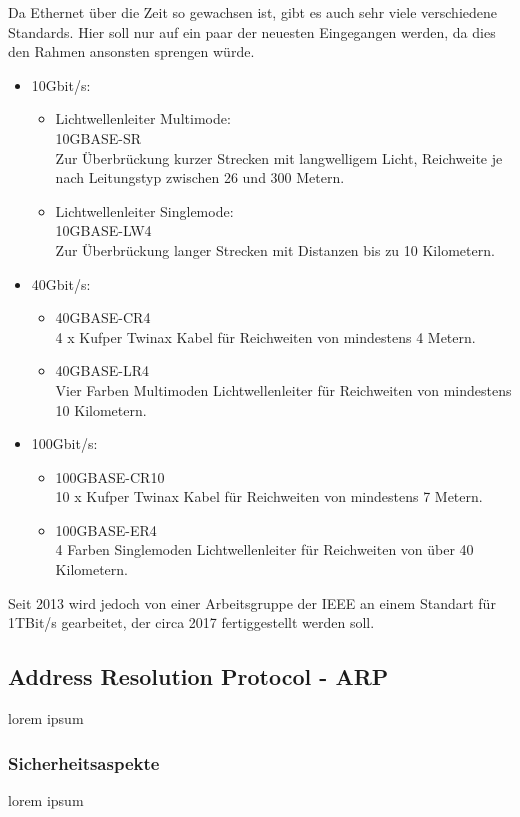 \documentclass[11pt,a4paper]{report}
\begin{document}
Da Ethernet über die Zeit so gewachsen ist, gibt es auch sehr viele verschiedene Standards. Hier soll nur auf ein paar der neuesten Eingegangen werden, da dies den Rahmen ansonsten sprengen würde.\\
\begin{itemize}
\item 10Gbit/s:
\begin{itemize}
\item Lichtwellenleiter Multimode:\\
10GBASE-SR\\
Zur Überbrückung kurzer Strecken mit langwelligem Licht, Reichweite je nach Leitungstyp zwischen 26 und 300 Metern.
\item Lichtwellenleiter Singlemode:\\
10GBASE-LW4\\
Zur Überbrückung langer Strecken mit Distanzen bis zu 10 Kilometern.
\end{itemize}
\item 40Gbit/s:
\begin{itemize}
\item 40GBASE-CR4\\
4 x Kufper Twinax Kabel für Reichweiten von mindestens 4 Metern.
\item 40GBASE-LR4\\
Vier Farben Multimoden Lichtwellenleiter für Reichweiten von mindestens 10 Kilometern.
\end{itemize}
\item 100Gbit/s:
\begin{itemize}
\item 100GBASE-CR10\\
10 x Kufper Twinax Kabel für Reichweiten von mindestens 7 Metern.
\item 100GBASE-ER4\\
4 Farben Singlemoden Lichtwellenleiter für Reichweiten von über 40 Kilometern.
\end{itemize}
\end{itemize}
Seit 2013 wird jedoch von einer Arbeitsgruppe der IEEE an einem Standart für 1TBit/s gearbeitet, der circa 2017 fertiggestellt werden soll.\\


\subsection{Address Resolution Protocol - ARP}\label{ssec:arp}
lorem ipsum
\subsubsection{Sicherheitsaspekte}\label{sssec:security}
lorem ipsum
\end{document}
